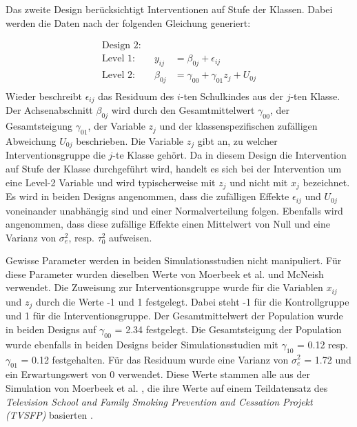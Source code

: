 \documentclass[12pt]{article}\usepackage[]{graphicx}\usepackage[]{color}
\begin{document}
Das zweite Design berücksichtigt Interventionen auf Stufe der Klassen. Dabei werden die Daten nach der folgenden Gleichung generiert:

\begin{equation} 
\begin{split}
 \text{Design 2:}\\
  \text{Level 1:}  \qquad y_{ij} & = \beta_{0j} + \epsilon_{ij}\\
 \text{Level 2:} \qquad \beta_{0j} & = \gamma_{00} + \gamma_{01}z_{j} + U_{0j}\\
\end{split}	
\end{equation} 
Wieder beschreibt $\epsilon_{ij}$ das Residuum des $i$-ten Schulkindes aus der $j$-ten Klasse. Der Achsenabschnitt $\beta_{0j}$ wird durch den Gesamtmittelwert $\gamma_{00}$, der Gesamtsteigung $\gamma_{01}$, der Variable $z_{j}$ und der klassenspezifischen zufälligen Abweichung $U_{0j}$ beschrieben. Die Variable $z_{j}$ gibt an, zu welcher Interventionsgruppe die $j$-te Klasse gehört. Da in diesem Design die Intervention auf Stufe der Klasse durchgeführt wird, handelt es sich bei der Intervention um eine Level-2 Variable und wird typischerweise mit $z_{j}$ und nicht mit $x_{j}$ bezeichnet. Es wird in beiden Designs angenommen, dass die zufälligen Effekte $\epsilon_{ij}$ und $U_{0j}$ voneinander unabhängig sind und einer Normalverteilung folgen. Ebenfalls wird angenommen, dass diese zufällige Effekte einen Mittelwert von Null und eine Varianz von $\sigma^{2}_{e}$, resp. $\tau^{2}_{0}$ aufweisen.

Gewisse Parameter werden in beiden Simulationsstudien nicht manipuliert. Für diese Parameter wurden dieselben Werte von Moerbeek et al. \citeyearpar{MOERBEEK2003341} und McNeish \citeyearpar{mcneish2014analyzing} verwendet. Die Zuweisung zur Interventionsgruppe wurde für die Variablen $x_{ij}$ und $z_{j}$ durch die Werte -1 und 1 festgelegt. Dabei steht -1 für die Kontrollgruppe und 1 für die Interventionsgruppe. Der Gesamtmittelwert der Population wurde in beiden Designs auf $\gamma_{00}$ = 2.34 festgelegt. Die Gesamtsteigung der Population wurde ebenfalls in beiden Designs beider Simulationsstudien mit $\gamma_{10}$ = 0.12 resp. $\gamma_{01}$ = 0.12 festgehalten. Für das Residuum wurde eine Varianz von $\sigma^{2}_{e}$ = 1.72 und ein Erwartungswert von 0 verwendet. Diese Werte stammen alle aus der Simulation von Moerbeek et al. \citeyearpar{MOERBEEK2003341}, die ihre Werte auf einem Teildatensatz des \textit{Television School and Family Smoking Prevention and Cessation Projekt (TVSFP)} basierten \citep{FLAY1995smoking}.
\end{document}
